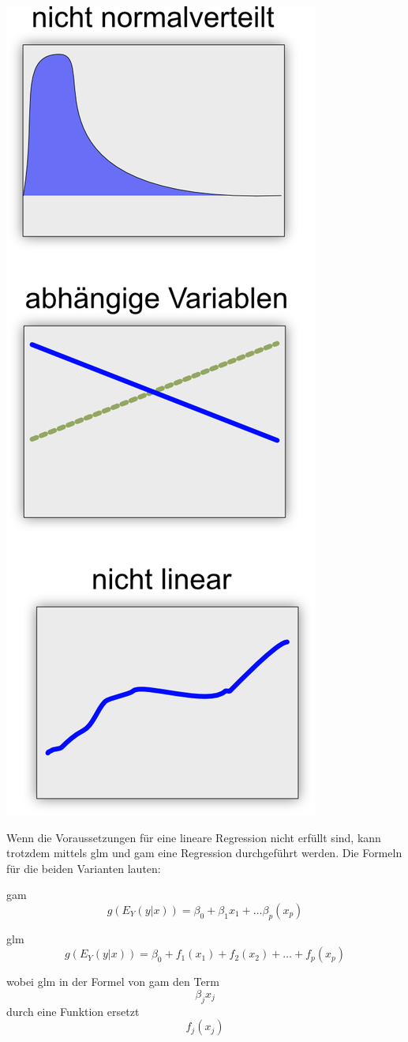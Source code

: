 \documentclass[
  12pt, %
  a4paper, %
  oneside, %
  openany, 
  numbers=noenddot, %
  BCOR=5mm, %
  parskip=half*, %
  thesis, %
]{bfhbook}
\begin{document}
\begin{minipage}[t]{0.3\linewidth}
	\begin{center}
		\vspace{0pt}
		\includegraphics[width=0.6\linewidth]{Bilder/Regressions-Auschluss-Bedingungen.png}
	\end{center}
\end{minipage}\hfill
\begin{minipage}[t]{0.55\linewidth}
\vspace{0pt}
Wenn die Voraussetzungen für eine lineare Regression nicht erfüllt sind, kann trotzdem mittels \Gls{glm} und \Gls{gam} eine Regression durchgeführt werden.
\break\break
Die Formeln für die beiden Varianten lauten:

\acrshort{gam} \[g(E_Y(y|x))=\beta_0+\beta_1x_1+…\beta_p(x_p)\]

\acrshort{glm} \[g(E_Y(y|x))=\beta_0+f_1(x_1)+f_2(x_2)+…+f_p(x_p)\]

wobei \acrshort{glm} in der Formel von \acrshort{gam} den Term \[\beta_jx_j\] durch eine Funktion ersetzt \[f_j(x_j)\]
\end{minipage}
\end{document}
